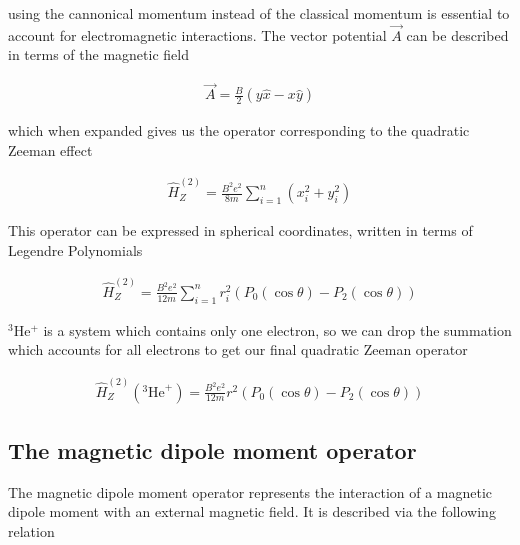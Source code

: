             \noindent using the cannonical momentum instead of the classical momentum is essential to account for electromagnetic interactions. The vector potential $\vec{A}$ can be described in terms of the magnetic field

            \begin{align}
                \vec{A} = \frac{B}{2} \left( y\hat{x} - x\hat{y} \right)
            \end{align}

            \noindent which when expanded gives us the operator corresponding to the quadratic Zeeman effect

            \begin{align}
                \hat{H}_Z^{(2)} = \frac{B^2 e^2}{8m} \sum_{i = 1}^n (x_i^2 + y_i^2)
            \end{align}

            \noindent This operator can be expressed in spherical coordinates, written in terms of Legendre Polynomials

            \begin{align}
                \hat{H}^{(2)}_Z = \frac{B^2 e^2}{12m} \sum_{i = 1}^n r_i^2 \left( P_0(\cos \theta) - P_2(\cos \theta) \right)
            \end{align}

            \noindent $^3$He$^+$ is a system which contains only one electron, so we can drop the summation which accounts for all electrons to get our final quadratic Zeeman operator

            \begin{align}
                \hat{H}^{(2)}_Z(^3\text{He}^+) = \frac{B^2 e^2}{12m} r^2 \left( P_0(\cos \theta) - P_2(\cos \theta) \right)
            \end{align}

        \subsection{The magnetic dipole moment operator}\label{sec:magnetic_dipole_operator}
            The magnetic dipole moment operator represents the interaction of a magnetic dipole moment with an external magnetic field. It is described via the following relation

